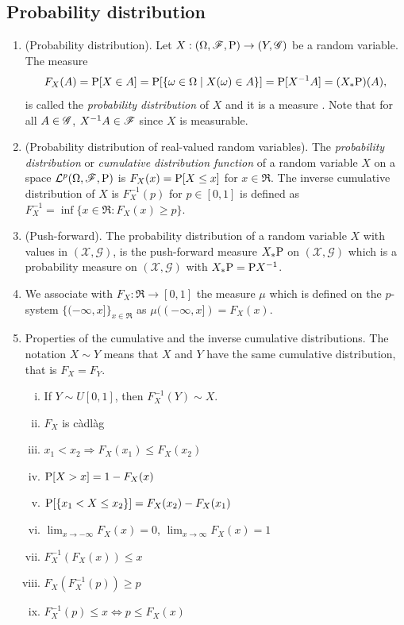 \documentclass[a4paper,10pt]{article}
\begin{document}
\subsection{Probability distribution}
\begin{enumerate} 
 
 \item (Probability distribution). Let $X:(\Omega,\mathscr{F},\mathrm{P}) \to (Y, \mathscr{G})$ be a random variable. The measure
 \[
  F_X(A) = \mathrm{P}[X\in A] = \mathrm{P}[\{\omega\in\Omega\mid X(\omega) \in A\}] = \mathrm{P}[X^{-1}A] = (X_*\mathrm{P})(A),
 \]
 is called the \textit{probability distribution} of $X$ and it is a measure . Note that for all $A\in\mathscr{G}$, $X^{-1}A\in\mathscr{F}$
 since $X$ is measurable. 
 \item \label{rv221088}
 (Probability distribution of real-valued random variables).
 The \textit{probability distribution} or \textit{cumulative distribution function} of a random variable $X$ on a space
 $\mathcal{L}^p(\Omega,\mathscr{F},\mathrm{P})$ is $F_X(x) = \mathrm{P}[X\leq x]$ for $x\in\Re$. The inverse cumulative
 distribution of $X$ is $F_X^{-1}(p)$ for $p\in[0,1]$ is defined as 
 $F_X^{-1}=\inf\{x\in\Re: F_X(x) \geq p\}$. 
 
 \item (Push-forward).
 \label{rv221089}
 The probability distribution of a random variable $X$ with values in $(\mathcal{X},\mathscr{G})$,
 is the push-forward measure $X_*\mathrm{P}$ on $(\mathcal{X},\mathscr{G})$ which is 
 a probability measure on $(\mathcal{X},\mathscr{G})$ with $X_*\mathrm{P} = \mathrm{P} X^{-1}$.
 
 
 \item 
 \label{rv221137}
 We associate with $F_X:\Re\to[0,1]$ the measure $\mu$ which is defined on 
 the $p$-system $\{(-\infty,x]\}_{x\in\Re}$ as $\mu((-\infty, x]) = F_X(x)$.
 \item
 \label{rv231132}
 Properties of the cumulative and the inverse cumulative distributions. The notation
 $X\sim Y$ means that $X$ and $Y$ have the same cumulative distribution, that is 
 $F_X = F_Y$.
    \begin{enumerate}[i.]
      \item If $Y\sim U[0,1]$, then $F_X^{-1}(Y) \sim X$.
      \item $F_X$ is c\`adl\`ag
      \item $x_1<x_2 \Rightarrow F_X(x_1) \leq F_X(x_2)$
      \item $\mathrm{P}[X>x] = 1 - F_X(x)$
      \item $\mathrm{P}[\{x_1 < X \leq x_2\}] = F_X(x_2) - F_X(x_1)$
      \item $\lim_{x\to-\infty}F_X(x) = 0$, $\lim_{x\to\infty}F_X(x) = 1$
      \item $F_X^{-1}(F_X(x)) \leq x$
      \item $F_X(F_X^{-1}(p)) \geq p$
      \item $F_X^{-1}(p) \leq x \Leftrightarrow p \leq F_X(x)$
    \end{enumerate}
\end{enumerate}
\end{document}
